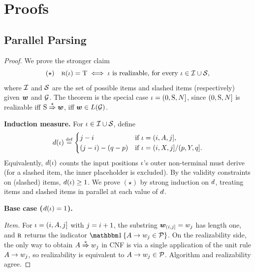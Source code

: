\documentclass{article}
\begin{document}
\section{Proofs}\label{app:constructionsproofs}
\subsection{Parallel Parsing}\label{app:proofsparsing}
\cflalgocorrectness*
\begin{proof}
    We prove the stronger claim
    \begin{equation*}
        (\star)\quad {\textsc{r}}({{ \iota}}) = {\mathbin{\mathrm{T}}} \;\Longleftrightarrow\; {{ \iota}} \text{ is realizable, for every } {{ \iota}} \in {{\mathcal{I}}} \cup {{\mathcal{S}}},
    \end{equation*}
    where ${{\mathcal{I}}}$ and ${{\mathcal{S}}}$ are the set of possible items and slashed items (respectively) given ${{\boldsymbol{w}}}$ and ${{ \mathcal{G}}}$. The theorem is the special case ${{ \iota}} = (0, {{ \mathrm{S}}}, {{ N}}]$, since $(0, {{ \mathrm{S}}}, {{ N}}]$ is realizable iff ${{ \mathrm{S}}} \mathrel{{\overset{*}{\Rightarrow}}} {{\boldsymbol{w}}}$, iff ${{\boldsymbol{w}}} \in {L}({{ \mathcal{G}}})$.
    
    \textbf{Induction measure.} For ${{ \iota}} \in {{\mathcal{I}}} \cup {{\mathcal{S}}}$, define
    \begin{equation*}
        \inductionmeasure(\itm) \defeq \begin{cases}
            \idxj - \idxi & \text{if } \itm = (\idxi, A, \idxj], \\
            (\idxj - \idxi) - (q - p) & \text{if } \itm = (\idxi, X, \idxj] / (p, Y, q].
        \end{cases}
    \end{equation*}
    Equivalently, ${d}({{ \iota}})$ counts the input positions ${{ \iota}}$'s outer non-terminal must derive (for a slashed item, the inner placeholder is excluded). By the validity constraints on (slashed) items, ${d}({{ \iota}}) \ge 1$. We prove $(\star)$ by strong induction on ${d}$, treating items and slashed items in parallel at each value of ${d}$.
    
    \textbf{Base case (${d}({{ \iota}}) = 1$).}
    
    \emph{Item.} For ${{ \iota}} = ({{ i}}, A, {{ j}}]$ with ${{ j}} = {{ i}} + 1$, the substring ${{\boldsymbol{w}}}_{({{ i}}, {{ j}}]} = {w}_{{ j}}$ has length one, and ${\textsc{r}}$ returns the indicator $\ind{\production{A}{\strSym_\idxj} \in \rules}$. On the realizability side, the only way to obtain $A \mathrel{{\overset{*}{\Rightarrow}}} {w}_{{ j}}$ in CNF is via a single application of the unit rule ${{ A \rightarrow {w}_{{ j}}}}$, so realizability is equivalent to ${{ A \rightarrow {w}_{{ j}}}} \in {{ \mathcal{P}}}$. Algorithm and realizability agree.
    

\end{proof}
\end{document}
